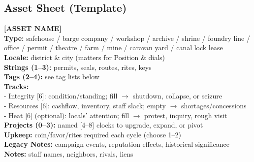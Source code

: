   \subsection{Asset Sheet (Template)}
  \begin{framed}
  \noindent\textbf{[ASSET NAME]}\\
  \textbf{Type:} safehouse / barge company / workshop / archive / shrine / foundry line / office / permit / theatre / farm / mine / caravan yard / canal lock lease\\
  \textbf{Locale:} district \& city (matters for Position \& dials)\\
  \textbf{Strings (1--3):} permits, seals, routes, rites, keys\\
  \textbf{Tags (2--4):} see tag lists below\\
  \textbf{Tracks:}\\
  \hspace{10pt}- Integrity [6]: condition/standing; fill $\rightarrow$ shutdown, collapse, or seizure\\
  \hspace{10pt}- Resources [6]: cashflow, inventory, staff slack; empty $\rightarrow$ shortages/concessions\\
  \hspace{10pt}- Heat [6] (optional): locals' attention; fill $\rightarrow$ protest, inquiry, rough visit\\
  \textbf{Projects (0--3):} named [4--8] clocks to upgrade, expand, or pivot\\
  \textbf{Upkeep:} coin/favor/rites required each cycle (choose 1--2)\\
  \textbf{Legacy Notes:} campaign events, reputation effects, historical significance\\
  \textbf{Notes:} staff names, neighbors, rivals, liens
  \end{framed}
  
